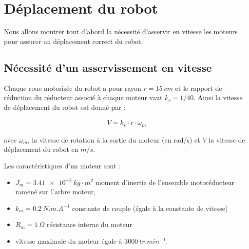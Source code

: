 \section{Déplacement du robot}

Nous allons montrer tout d'abord la nécessité d'asservir en vitesse les
moteurs pour assurer un déplacement correct du robot.

\subsection{Nécessité d'un asservissement en vitesse}

Chaque roue motorisée du robot a pour rayon $r = \SI{15}{cm}$ et le
rapport de réduction du réducteur associé à chaque moteur vaut
$k_r= 1/40$. Ainsi la vitesse de déplacement du robot est donné par  : 

\begin{align*}
V=k_r\cdot r\cdot \omega_m
\end{align*}

avec $\omega_m$, la vitesse de rotation à la sortie du moteur (en rad/s) et $V$ la vitesse de déplacement du robot en $m/s$.

Les caractéristiques d'un moteur sont :

\begin{itemize}
\item $J_m = \SI{3,4 1e-3}{kg \cdot m^2}$ moment
  d'inertie de l'ensemble motoréducteur ramené sur l'arbre moteur,
\item $k_m = \SI{0,2}{N.m.A^{-1}}$ constante de
  couple (égale à la constante de vitesse)
\item $R_m= \SI{1}{\Omega}$ résistance interne du moteur
\item vitesse maximale du moteur égale à $\SI{3000}{tr.min^{-1}}$.
\end{itemize}





